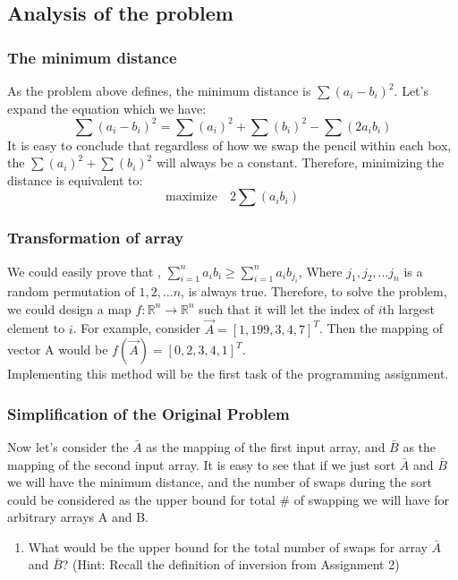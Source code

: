 \documentclass{article}
\begin{document}
\begin{enumerate}
    \subsection{Analysis of the problem}
    \subsubsection{The minimum distance}
    As the problem above defines, the minimum distance is $\sum (a_i-b_i)^2$. Let's expand the equation which we have:
    $$\sum (a_i-b_i)^2=\sum (a_i)^2+ \sum (b_i)^2-\sum (2a_ib_i)$$
    It is easy to conclude that regardless of how we swap the pencil within each box, the $\sum (a_i)^2+ \sum (b_i)^2$ will always be a constant. Therefore, minimizing the distance is equivalent to:
    $$\text{maximize} \quad 2\sum (a_i b_i)$$
    \subsubsection{Transformation of array}
    We could easily prove that , $\sum_{i=1}^{n} a_ib_i \geq \sum_{i=1}^{n} a_ib_{j_i}$, Where $j_1,j_2, \dots j_n$ is a random permutation of $1,2,\dots n$, is always true. Therefore, to solve the problem, we could design a map $f: \mathbb{R}^n \to \mathbb{R}^n$ such that it will let the index of $i$th largest element to $i$. For example, consider $\vec{A}=[1,199,3,4,7]^T$. Then the mapping of vector A would be $f(\vec{A})=[0,2,3,4,1]^T$.\\
    Implementing this method will be the first task of the programming assignment.

    \subsubsection{Simplification of the Original Problem}
Now let's consider the $\bar{A}$ as the mapping of the first input array, and $\bar{B}$ as the mapping of the second input array. It is easy to see that if we just sort $\bar{A}$ and $\bar{B}$ we will have the minimum distance, and the number of swaps during the sort could be considered as the upper bound for total \# of swapping we will have for arbitrary arrays A and B. 
\begin{enumerate}\addtocounter{enumi}{1}
  \item What would be the upper bound for the total number of swaps for array $\bar{A}$ and $\bar{B}$? (Hint: Recall the definition of inversion from Assignment 2)
  \vspace{70 mm}


\end{enumerate}
\end{enumerate}
\end{document}

